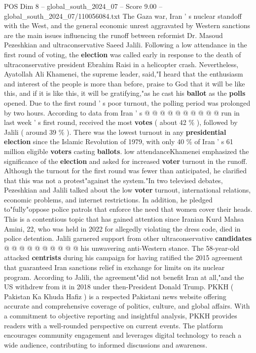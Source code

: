 \begin{textsample}{POS Dim 8 – global\_south\_2024\_07 – Score 9.00 – global\_south\_2024\_07/110056084.txt}
The Gaza war, Iran ' s nuclear standoff with the West, and the general economic unrest aggravated by Western sanctions are the main issues influencing the runoff between reformist Dr.
Masoud Pezeshkian and ultraconservative Saeed Jalili.
Following a low attendance in the first round of voting, the \textbf{election} was called early in response to the death of ultraconservative president Ebrahim Raisi in a helicopter crash.
Nevertheless, Ayatollah Ali Khamenei, the supreme leader, said,"I heard that the enthusiasm and interest of the people is more than before, praise to God that it will be like this, and if it is like this, it will be gratifying,"as he cast his \textbf{ballot} as the \textbf{polls} opened.
Due to the first round ' s poor turnout, the polling period was prolonged by two hours.
According to data from Iran ' s @ @ @ @ @ @ @ @ @ @ run in last week ' s first round, received the most \textbf{votes} ( about 42 \% ), followed by Jalili ( around 39 \% ).
There was the lowest turnout in any \textbf{presidential} \textbf{election} since the Islamic Revolution of 1979, with only 40 \% of Iran ' s 61 million eligible \textbf{voters} casting \textbf{ballots}. low attendanceKhamenei emphasized the significance of the \textbf{election} and asked for increased \textbf{voter} turnout in the runoff.
Although the turnout for the first round was fewer than anticipated, he clarified that this was not a protest"against the system."In two televised debates, Pezeshkian and Jalili talked about the low \textbf{voter} turnout, international relations, economic problems, and internet restrictions.
In addition, he pledged to"fully"oppose police patrols that enforce the need that women cover their heads.
This is a contentious topic that has gained attention since Iranian Kurd Mahsa Amini, 22, who was held in 2022 for allegedly violating the dress code, died in police detention.
Jalili garnered support from other ultraconservative \textbf{candidates} @ @ @ @ @ @ @ @ @ @ his unwavering anti-Western stance.
The 58-year-old attacked \textbf{centrists} during his campaign for having ratified the 2015 agreement that guaranteed Iran sanctions relief in exchange for limits on its nuclear program.
According to Jalili, the agreement"did not benefit Iran at all,"and the US withdrew from it in 2018 under then-President Donald Trump.
PKKH ( Pakistan Ka Khuda Hafiz ) is a respected Pakistani news website offering accurate and comprehensive coverage of politics, culture, and global affairs.
With a commitment to objective reporting and insightful analysis, PKKH provides readers with a well-rounded perspective on current events.
The platform encourages community engagement and leverages digital technology to reach a wide audience, contributing to informed discussions and awareness.

\end{textsample}
